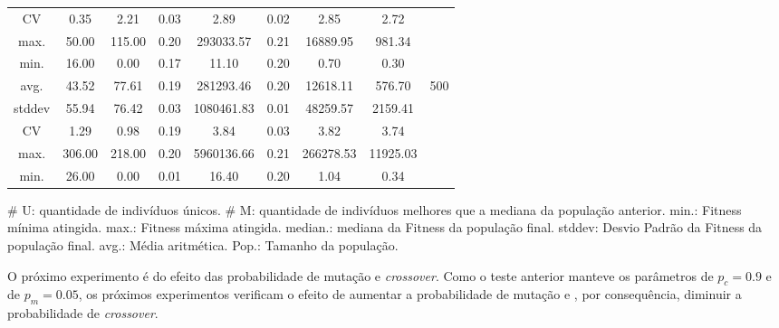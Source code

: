 \documentclass[a4paper]{paper}
\begin{document}
\begin{table}[h!]
\begin{tabular}{| c | c | c | c | c | c | c | c | c |}
    CV & 0.35 & 2.21 & 0.03 & 2.89 & 0.02 & 2.85 & 2.72 & \\ \cline{1-8}
    max. & 50.00 & 115.00 & 0.20 & 293033.57 & 0.21 & 16889.95 & 981.34 & \\ \cline{1-8}
    min. & 16.00 & 0.00 & 0.17 & 11.10 & 0.20 & 0.70 & 0.30 & \\ \hline \hline
    avg. & 43.52 & 77.61 & 0.19 & 281293.46 & 0.20 & 12618.11 & 576.70 & \multirow{5}{1.5cm}{500} \\ \cline{1-8}
    stddev & 55.94 & 76.42 & 0.03 & 1080461.83 & 0.01 & 48259.57 & 2159.41 & \\ \cline{1-8}
    CV & 1.29 & 0.98 & 0.19 & 3.84 & 0.03 & 3.82 & 3.74 & \\ \cline{1-8}
    max. & 306.00 & 218.00 & 0.20 & 5960136.66 & 0.21 & 266278.53 & 11925.03 & \\ \cline{1-8}
    min. & 26.00 & 0.00 & 0.01 & 16.40 & 0.20 & 1.04 & 0.34 & \\ \hline
  \end{tabular}
  \begin{minipage}{0.9\textwidth}
    {\footnotesize
      \# U: quantidade de indivíduos únicos. \# M: quantidade de indivíduos melhores
      que a mediana da população anterior. min.: Fitness mínima atingida. max.:
      Fitness máxima atingida. median.: mediana da Fitness da população final.
      stddev: Desvio Padrão da Fitness da população final. avg.: Média aritmética.
      Pop.: Tamanho da população.
    }
  \end{minipage}
\end{table}

O próximo experimento é do efeito das probabilidade de mutação e
\textit{crossover}.  Como o teste anterior manteve os parâmetros de $p_c=0.9$ e
de $p_m=0.05$, os próximos experimentos verificam o efeito de aumentar a
probabilidade de mutação e , por consequência, diminuir a probabilidade de
\textit{crossover}.
\end{document}
